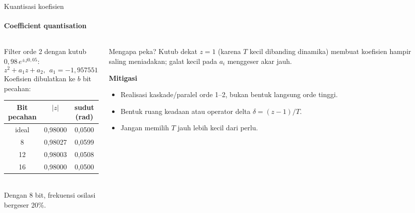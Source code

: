 \documentclass[aspectratio=169,10pt]{beamer}
\begin{document}
\begin{frame}{Kuantisasi koefisien}
	\framesubtitle{Coefficient quantisation}
	\begin{columns}[T]
		\begin{column}{0.52\textwidth}
			\small
			Filter orde 2 dengan kutub $0{,}98\,e^{\pm j0{,}05}$:
			\[
				z^2 + a_1z + a_2,\ \ a_1 = -1{,}957551,\ \ a_2 = 0{,}960400
			\]
			Koefisien dibulatkan ke $b$ bit pecahan:\\[3pt]
			\renewcommand{\arraystretch}{1.2}
			\begin{tabular}{@{}c c c@{}}
				\toprule
				Bit pecahan & $|z|$ & sudut (rad) \\
				\midrule
				ideal & 0,98000 & 0,0500 \\
				8 & 0,98027 & 0,0599 \\
				12 & 0,98003 & 0,0508 \\
				16 & 0,98000 & 0,0500 \\
				\bottomrule
			\end{tabular}\\[3pt]
			Dengan 8 bit, frekuensi osilasi bergeser 20\%.
		\end{column}
		\begin{column}{0.44\textwidth}
			\begin{alertblock}{Mengapa peka?}
				\small
				Kutub dekat $z=1$ (karena $T$ kecil dibanding dinamika) membuat koefisien hampir saling meniadakan; galat kecil pada $a_i$ menggeser akar jauh.
			\end{alertblock}
			\small
			\textbf{Mitigasi}
			\begin{itemize}
				\item Realisasi kaskade/paralel orde 1--2, bukan bentuk langsung orde tinggi.
				\item Bentuk ruang keadaan atau operator delta $\delta = (z-1)/T$.
				\item Jangan memilih $T$ jauh lebih kecil dari perlu.
			\end{itemize}
		\end{column}
	\end{columns}
\end{frame}
\end{document}
